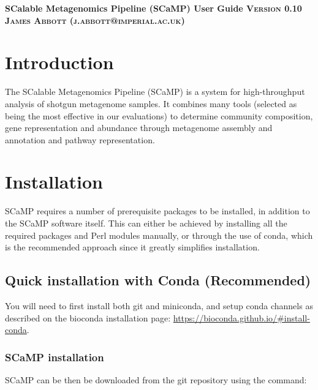 \documentclass[a4paper,10pt]{article}
\begin{document}
\begin{titlepage}
\begin{center}
  \bfseries
  \huge SCalable Metagenomics Pipeline (SCaMP) User Guide
  \vskip 0.1in
  \textsc{\normalsize Version 0.10 }
  \vskip 0.1in
  \textsc{\normalsize James Abbott (j.abbott@imperial.ac.uk)}
\end{center}

\tableofcontents
\renewcommand{\baselinestretch}{1.0}\normalsize
\end{titlepage}
\newpage
\graphicspath{ {images/} }

\section{Introduction}

The SCalable Metagenomics Pipeline (SCaMP) is a system for high-throughput
analysis of shotgun metagenome samples. It combines many tools (selected as
being the most effective in our evaluations) to determine community
composition, gene representation and abundance through metagenome assembly and
annotation and pathway representation. 

\section{Installation}

SCaMP requires a number of prerequisite packages to be installed, in addition                            
to the SCaMP software itself. This can either be achieved by installing all the
required packages and Perl modules manually, or through the use of conda, which
is the recommended approach since it greatly simplifies installation.  

\subsection{Quick installation with Conda (Recommended)}

You will need to first install both git and miniconda, and setup conda channels
as described on the bioconda installation page: \url{https://bioconda.github.io/#install-conda}.                                  

\subsubsection{SCaMP installation}

SCaMP can be then be downloaded from the git repository using the command:                                           
\end{document}
